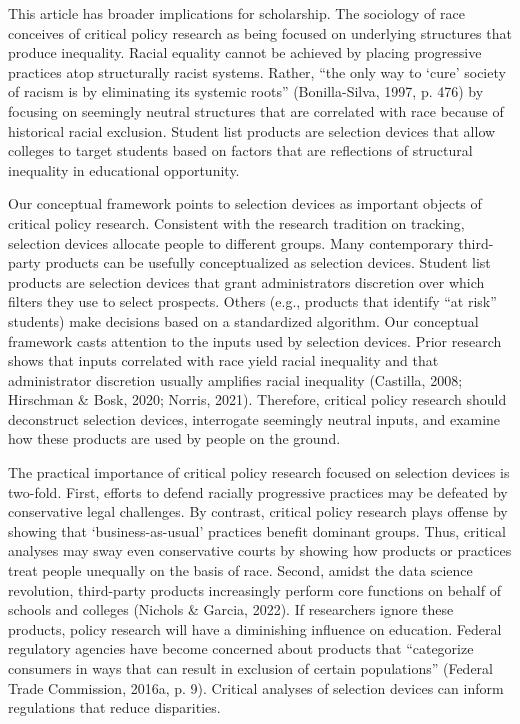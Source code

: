 \documentclass[
  12pt,
]{article}
\begin{document}
This article has broader implications for scholarship. The sociology of race conceives of critical policy research as being focused on underlying structures that produce inequality. Racial equality cannot be achieved by placing progressive practices atop structurally racist systems. Rather, ``the only way to `cure' society of racism is by eliminating its systemic roots'' (Bonilla-Silva, 1997, p. 476) by focusing on seemingly neutral structures that are correlated with race because of historical racial exclusion. Student list products are selection devices that allow colleges to target students based on factors that are reflections of structural inequality in educational opportunity.

Our conceptual framework points to selection devices as important objects of critical policy research. Consistent with the research tradition on tracking, selection devices allocate people to different groups. Many contemporary third-party products can be usefully conceptualized as selection devices. Student list products are selection devices that grant administrators discretion over which filters they use to select prospects. Others (e.g., products that identify ``at risk'' students) make decisions based on a standardized algorithm. Our conceptual framework casts attention to the inputs used by selection devices. Prior research shows that inputs correlated with race yield racial inequality and that administrator discretion usually amplifies racial inequality (Castilla, 2008; Hirschman \& Bosk, 2020; Norris, 2021). Therefore, critical policy research should deconstruct selection devices, interrogate seemingly neutral inputs, and examine how these products are used by people on the ground.

The practical importance of critical policy research focused on selection devices is two-fold. First, efforts to defend racially progressive practices may be defeated by conservative legal challenges. By contrast, critical policy research plays offense by showing that `business-as-usual' practices benefit dominant groups. Thus, critical analyses may sway even conservative courts by showing how products or practices treat people unequally on the basis of race. Second, amidst the data science revolution, third-party products increasingly perform core functions on behalf of schools and colleges (Nichols \& Garcia, 2022). If researchers ignore these products, policy research will have a diminishing influence on education. Federal regulatory agencies have become concerned about products that ``categorize consumers in ways that can result in exclusion of certain populations'' (Federal Trade Commission, 2016a, p. 9). Critical analyses of selection devices can inform regulations that reduce disparities.
\end{document}
